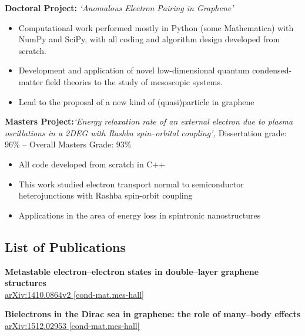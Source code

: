 \documentclass[11pt,a4paper,sans]{moderncv}        %
\begin{document}
\begin{itemize}
\small{
\item{\textbf{Doctoral Project:} \textit{\small{`Anomalous Electron Pairing in Graphene'}}
\small{\begin{itemize}
\item Computational work performed mostly in Python (some Mathematica) with NumPy and SciPy, with all coding and algorithm design developed from scratch.
\item Development and application of novel low-dimensional quantum condensed-matter field theories to the study of mesoscopic systems.
\item Lead to the proposal of a new kind of (quasi)particle in graphene
\end{itemize}}}
\item{\textbf{Masters Project:}\textit{\small{`Energy relaxation rate of an external electron due to plasma oscillations in a 2DEG with Rashba spin--orbital coupling', }}\small{Dissertation grade: 96\% -- Overall Masters Grade: 93\%}
\small{\begin{itemize}
\item All code developed from scratch in C++
\item This work studied electron transport normal to semiconductor heterojunctions with Rashba spin-orbit coupling
\item Applications in the area of energy loss in spintronic nanostructures
\end{itemize}}}}
\end{itemize}
\vspace{5pt}
\subsection{List of Publications}

\vspace{5pt}

\begin{itemize}
\small{
\item{\textbf{Metastable electron--electron states in double--layer graphene structures}\\
      \textcolor{blue}{\underline{\href{https://arxiv.org/abs/1410.0864}{\small{arXiv:1410.0864v2 [cond-mat.mes-hall]}}}}}

\vspace{4pt}

\item{\textbf{Bielectrons in the Dirac sea in graphene: the role of many–body effects}\\
		\textcolor{blue}{\underline{\href{http://arxiv.org/abs/1512.02953}{\small{arXiv:1512.02953 [cond-mat.mes-hall]}}}}}
\small}
\end{itemize}
\end{document}
